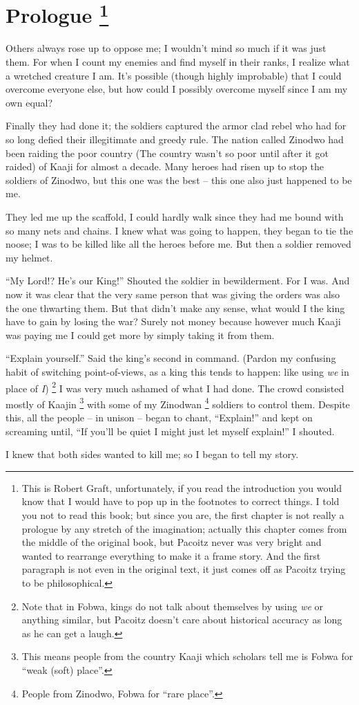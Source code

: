 \chapter[Prologue]{Prologue
\footnote{This is Robert Graft, unfortunately, if you read the introduction you would know that I would have to pop up in the footnotes to correct things. I told you not to read this book; but since you are, the first chapter is not really a prologue by any stretch of the imagination; actually this chapter comes from the middle of the original book, but Pacoitz never was very bright and wanted to rearrange everything to make it a frame story. And the first paragraph is not even in the original text, it just comes off as Pacoitz trying to be philosophical.}
}

Others always rose up to oppose me;
I wouldn't mind so much if it was just them.
For when I count my enemies and find myself in their ranks, I realize what a wretched creature I am.
It's possible (though highly improbable) that I could overcome everyone else, but how could I possibly overcome myself since I am my own equal?

\tbreak

Finally they had done it;
the soldiers captured the armor clad rebel who had for so long defied their illegitimate and greedy rule.
The nation called Zinodwo had been raiding the poor country (The country wasn't so poor until after it got raided) of Kaaji for almost a decade.
Many heroes had risen up to stop the soldiers of Zinodwo, but this one was the best -- this one also just happened to be me.

They led me up the scaffold, I could hardly walk since they had me bound with so many nets and chains. I knew what was going to happen, they began to tie the noose; I was to be killed like all the heroes before me. But then a soldier removed my helmet.

``My Lord!? He's our King!'' Shouted the soldier in bewilderment.
For I was.
And now it was clear that the very same person that was giving the orders was also the one thwarting them.
But that didn't make any sense, what would I the king have to gain by losing the war? Surely not money because however much Kaaji was paying me I could get more by simply taking it from them.

\indent ``Explain yourself.'' Said the king's second in command.
(Pardon my confusing habit of switching point-of-views, as a king this tends to happen: like using \emph{we} in place of \emph{I})
\footnote{Note that in Fo\-bwa, kings do not talk about themselves by using \emph{we} or anything similar, but Pacoitz doesn't care about historical accuracy as long as he can get a laugh.}
I was very much ashamed of what I had done.
The crowd consisted mostly of Kaajin
\footnote{This means people from the country Kaaji which scholars tell me is Fo\-bwa for ``weak (soft) place''.} with some of my Zinodwan
\footnote{People from Zinodwo, Fo\-bwa for ``rare place''.} soldiers to control them. Despite this, all the people -- in unison -- began to chant, ``Explain!'' and kept on screaming until, ``If you'll be quiet I might just let myself explain!'' I shouted. 

I knew that both sides wanted to kill me; so I began to tell my story.
